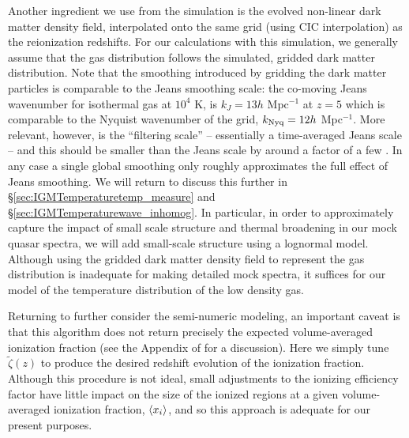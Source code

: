 Another ingredient we use from the \citet{McQuinn:2007dy} simulation is the evolved non-linear
dark matter density field, interpolated onto the same grid (using CIC interpolation) as the reionization redshifts. For our calculations with this simulation, we generally assume that
the gas distribution follows the simulated, gridded dark matter distribution. Note that the smoothing introduced by gridding the dark matter particles is
comparable to the Jeans smoothing scale:
the co-moving Jeans wavenumber for isothermal gas
at $10^4$ K, is $k_J = 13 h$ Mpc$^{-1}$ at $z=5$ which is comparable to the Nyquist wavenumber of the grid, $k_{\rm Nyq} = 12 h$ Mpc$^{-1}$.
More relevant, however, is the ``filtering scale'' -- essentially a time-averaged Jeans scale -- and this should be smaller than the Jeans scale by around a factor of a few \citep{Gnedin:1997td}. In any case a single global smoothing only roughly approximates the full effect of Jeans smoothing. We will return to discuss this further in \S \ref{sec:IGMTemperaturetemp_measure} and \S \ref{sec:IGMTemperaturewave_inhomog}. In particular, in order to approximately 
capture the impact of small scale structure and thermal broadening in our mock quasar spectra, we will add small-scale structure using a lognormal model. Although using the gridded dark matter density field to represent the gas distribution is inadequate for making detailed mock spectra, it suffices for our model of the temperature distribution of the low density gas.

Returning to further consider the semi-numeric modeling, an important caveat is that this algorithm does not return precisely the
expected volume-averaged ionization fraction (see the Appendix of \citealt{Zahn:2006sg} for a discussion). 
Here we simply tune $\tilde{\zeta}(z)$
to produce the desired redshift evolution of the ionization fraction. 
Although this procedure is not
ideal, small adjustments to the ionizing efficiency factor have little impact on 
the size of the ionized regions at a given volume-averaged ionization fraction, $\langle x_i \rangle$,
and so this approach is adequate for our present purposes.


